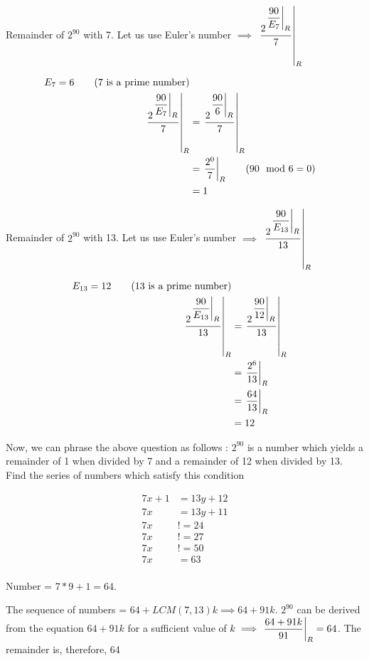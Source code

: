 Remainder of $2^{90}$ with 7. Let us use Euler's number $\implies$ $\displaystyle{ \left. \frac{ 2^{ \displaystyle{ \left. \frac{90}{E_7} \right |_{R} } } }{ 7 } \right |_{R} }$

\begin{align*}
    E_7 = 6 \tag{7 is a prime number} \\
    \displaystyle{ \left. \frac{ 2^{ \displaystyle{ \left. \frac{90}{E_7} \right |_{R} } } }{ 7 } \right |_{R} } &= \displaystyle{ \left. \frac{ 2^{ \displaystyle{ \left. \frac{90}{6} \right |_{R} } } }{ 7 } \right |_{R} } \\
    &= \displaystyle{ \left. \frac{ 2^{0} }{ 7 } \right |_{R} } \tag{$90 \mod 6 = 0$} \\
    &= 1 \\
\end{align*}

Remainder of $2^{90}$ with 13. Let us use Euler's number $\implies$ $\displaystyle{ \left. \frac{ 2^{ \displaystyle{ \left. \frac{90}{E_{13} } \right |_{R} } } }{ 13 } \right |_{R} }$

\begin{align*}
    E_{13} = 12 \tag{13 is a prime number} \\
    \displaystyle{ \left. \frac{ 2^{ \displaystyle{ \left. \frac{90}{E_{13}} \right |_{R} } } }{ 13 } \right |_{R} } &= \displaystyle{ \left. \frac{ 2^{ \displaystyle{ \left. \frac{90}{12} \right |_{R} } } }{ 13 } \right |_{R} } \\
    &= \displaystyle{ \left. \frac{ 2^{6} }{ 13 } \right |_{R} } \\
    &= \displaystyle{ \left. \frac{ 64 }{ 13 } \right |_{R} } \\
    &= 12 \\
\end{align*}

Now, we can phrase the above question as follows : $2^{90}$ is a number which yields a remainder of 1 when divided by 7 and a remainder of 12 when divided by 13. Find the series of numbers which satisfy this condition

\begin{align*}
    7x + 1 &= 13y + 12 \\
    7x &= 13y + 11 \\
    7x &!= 24 \tag{$y = 1$, $x$ is not an integer in this equation} \\
    7x &!= 27 \tag{$y = 2$, $x$ is not an integer in this equation} \\
    7x &!= 50 \tag{$y = 3$, $x$ is not an integer in this equation} \\
    7x &= 63 \tag{$y = 4 \implies x = 9$} \\
\end{align*}

Number = $7*9 + 1 = 64$.

The sequence of numbers = $64 + LCM(7,13)k \implies 64 + 91k$. $2^{90}$ can be derived from the equation $64 + 91k$ for a sufficient value of $k \implies \displaystyle{ \left. \frac{64 + 91k}{91} \right |_{R} } = 64$. The remainder is, therefore, 64

